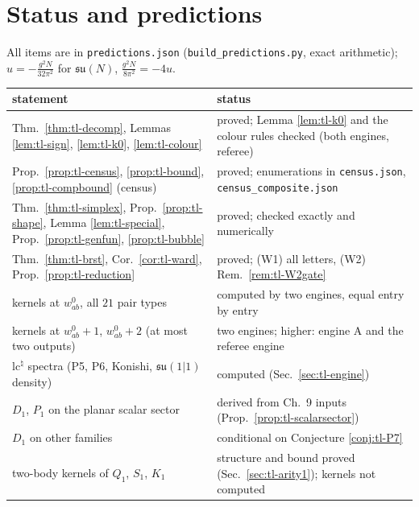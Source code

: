 \documentclass[11pt]{article}
\numberwithin{equation}{section}
\theoremstyle{plain}
\theoremstyle{definition}
\begin{document}
\section{Status and predictions}
\label{sec:tl-pred}

All items are in \texttt{predictions.json} (\texttt{build\_predictions.py}, exact arithmetic); $u=-\frac{g^2N}{32\pi^2}$ for $\mathfrak{su}(N)$, $\frac{g^2N}{8\pi^2}=-4u$.

\begin{center}\scriptsize
\begin{tabular}{l|l}
statement & status\\\hline
Thm.~\ref{thm:tl-decomp}, Lemmas \ref{lem:tl-sign}, \ref{lem:tl-k0}, \ref{lem:tl-colour} & proved; Lemma \ref{lem:tl-k0} and the colour rules checked (both engines, referee)\\
Prop.~\ref{prop:tl-census}, \ref{prop:tl-bound}, \ref{prop:tl-compbound} (census) & proved; enumerations in \texttt{census.json}, \texttt{census\_composite.json}\\
Thm.~\ref{thm:tl-simplex}, Prop.~\ref{prop:tl-shape}, Lemma \ref{lem:tl-special}, Prop.~\ref{prop:tl-genfun}, \ref{prop:tl-bubble} & proved; checked exactly and numerically\\
Thm.~\ref{thm:tl-brst}, Cor.~\ref{cor:tl-ward}, Prop.~\ref{prop:tl-reduction} & proved; (W1) all letters, (W2) Rem.~\ref{rem:tl-W2gate}\\
kernels at $w^0_{ab}$, all $21$ pair types & computed by two engines, equal entry by entry\\
kernels at $w^0_{ab}+1$, $w^0_{ab}+2$ (at most two outputs) & two engines; higher: engine A and the referee engine\\
$\mathrm{lc}^\natural$ spectra (P5, P6, Konishi, $\mathfrak{su}(1|1)$ density) & computed (Sec.~\ref{sec:tl-engine})\\
$D_1$, $P_1$ on the planar scalar sector & derived from Ch.~9 inputs (Prop.~\ref{prop:tl-scalarsector})\\
$D_1$ on other families & conditional on Conjecture \ref{conj:tl-P7}\\
two-body kernels of $Q_1$, $S_1$, $K_1$ & structure and bound proved (Sec.~\ref{sec:tl-arity1}); kernels not computed
\end{tabular}
\end{center}
\end{document}
